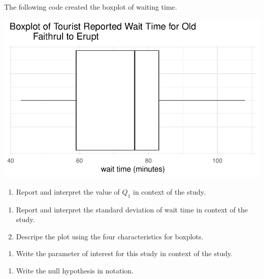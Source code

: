 \documentclass[
]{report}
\providecommand{\tightlist}{%
  \setlength{\itemsep}{0pt}\setlength{\parskip}{0pt}}
\begin{document}
The following code created the boxplot of waiting time.

\begin{center}\includegraphics[width=0.6\linewidth]{10-UR-module6_review_files/figure-latex/unnamed-chunk-2-1} \end{center}

\begin{enumerate}
\def\labelenumi{\arabic{enumi}.}
\tightlist
\item
  Report and interpret the value of \(Q_1\) in context of the study.
\end{enumerate}

\vspace{0.5in}

\begin{enumerate}
\def\labelenumi{\arabic{enumi}.}
\setcounter{enumi}{1}
\item
  Report and interpret the standard deviation of wait time in context of the study.
  \vspace{0.2in}
\item
  Descripe the plot using the four characteristics for boxplots.
\end{enumerate}

\vspace{1in}

\begin{enumerate}
\def\labelenumi{\arabic{enumi}.}
\setcounter{enumi}{3}
\tightlist
\item
  Write the parameter of interest for this study in context of the study.
\end{enumerate}

\vspace{0.8in}

\begin{enumerate}
\def\labelenumi{\arabic{enumi}.}
\setcounter{enumi}{4}
\tightlist
\item
  Write the null hypothesis in notation.
\end{enumerate}
\end{document}
